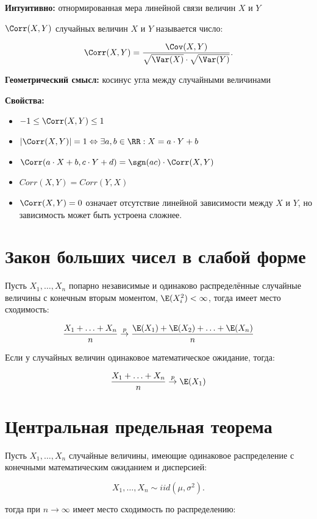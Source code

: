 \documentclass[12pt, a4paper, oneside]{article}
\begin{document}
\textbf{Интуитивно:} отнормированная мера линейной связи величин $X$ и $Y$

 $\Corr(X, Y)$ случайных величин $X$ и $Y$ называется число:

$$
\Corr(X, Y) = \frac{\Cov(X, Y)}{\sqrt{\Var(X)} \cdot \sqrt{\Var(Y)}}.
$$

\textbf{Геометрический смысл:} косинус угла между случайными величинами

\textbf{Свойства:}

\begin{itemize} 
\item $ -1 \leq \Corr(X, Y) \leq 1$
\item  $\left| \Corr(X, Y) \right| = 1 \Leftrightarrow \exists a, b \in \RR: X = a \cdot Y + b$
\item $\Corr(a \cdot X + b, c \cdot Y + d) = \sgn(ac) \cdot \Corr(X, Y)$
\item $Corr(X,Y) = Corr(Y, X)$
\item $\Corr(X,Y)=0$ означает отсутствие линейной зависимости между $X$ и $Y$, но зависимость может быть устроена сложнее.
\end{itemize} 


\section{Закон больших чисел в слабой форме}

Пусть $X_1, \ldots, X_n$ попарно независимые и одинаково распределённые случайные величины с конечным вторым моментом, $\E(X_i^2) < \infty$, тогда имеет место сходимость:

$$
\frac{X_1 + \ldots + X_n}{n} \overset{p}{\to} \frac{\E(X_1) + \E(X_2) + \ldots + \E(X_n)}{n}
$$

Если у случайных величин одинаковое математическое ожидание, тогда: 

$$
\frac{X_1 + \ldots + X_n}{n} \overset{p}{\to} \E(X_1)
$$

\section{Центральная предельная теорема}

Пусть $X_1, \ldots, X_n$ случайные величины, имеющие одинаковое распределение с конечными математическим ожиданием и дисперсией:

$$
X_1, \ldots, X_n \sim iid(\mu,\sigma^2).
$$

тогда при $n \to \infty$ имеет место сходимость по распределению: 
\end{document}
